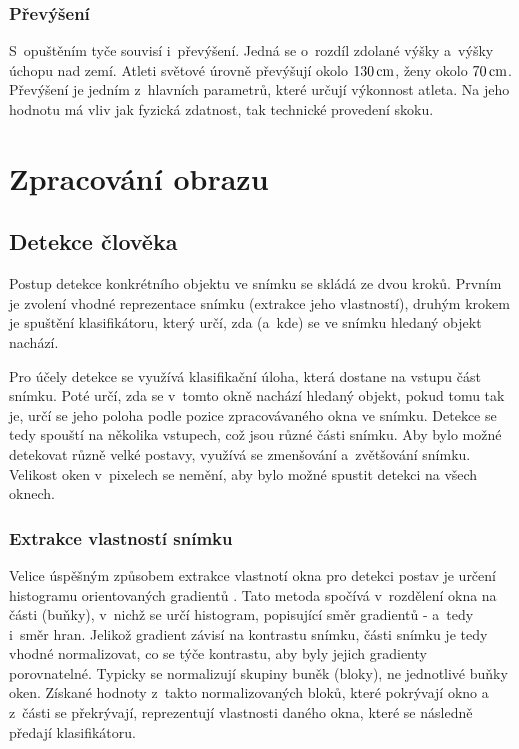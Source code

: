 \subsubsection{Převýšení}

S~opuštěním tyče souvisí i~převýšení. Jedná se o~rozdíl zdolané výšky a~výšky úchopu nad zemí. Atleti světové úrovně převýšují okolo $130\,\rm cm$, ženy okolo $70\,\rm cm$. Převýšení je jedním z~hlavních parametrů, které určují výkonnost atleta. Na jeho hodnotu má vliv jak fyzická zdatnost, tak technické provedení skoku.




\section{Zpracování obrazu}



\subsection{Detekce člověka}

Postup detekce konkrétního objektu ve snímku se skládá ze dvou kroků. Prvním je zvolení vhodné reprezentace snímku (extrakce jeho vlastností), druhým krokem je spuštění klasifikátoru, který určí, zda (a~kde) se ve snímku hledaný objekt nachází.

Pro účely detekce se využívá klasifikační úloha, která dostane na vstupu část snímku. Poté určí, zda se v~tomto okně nachází hledaný objekt, pokud tomu tak je, určí se jeho poloha podle pozice zpracovávaného okna ve snímku. Detekce se tedy spouští na několika vstupech, což jsou různé části snímku. Aby bylo možné detekovat různě velké postavy, využívá se zmenšování a~zvětšování snímku. Velikost oken v~pixelech se nemění, aby bylo možné spustit detekci na všech oknech.


\subsubsection{Extrakce vlastností snímku}

Velice úspěšným způsobem extrakce vlastnotí okna pro detekci postav je určení histogramu orientovaných gradientů \citep{HOG}. Tato metoda spočívá v~rozdělení okna na části (buňky), v~nichž se určí histogram, popisující směr gradientů - a~tedy i~směr hran. Jelikož gradient závisí na kontrastu snímku, části snímku je tedy vhodné normalizovat, co se týče kontrastu, aby byly jejich gradienty porovnatelné. Typicky se normalizují skupiny buněk (bloky), ne jednotlivé buňky oken. Získané hodnoty z~takto normalizovaných bloků, které pokrývají okno a z~části se překrývají, reprezentují vlastnosti daného okna, které se následně předají klasifikátoru.

